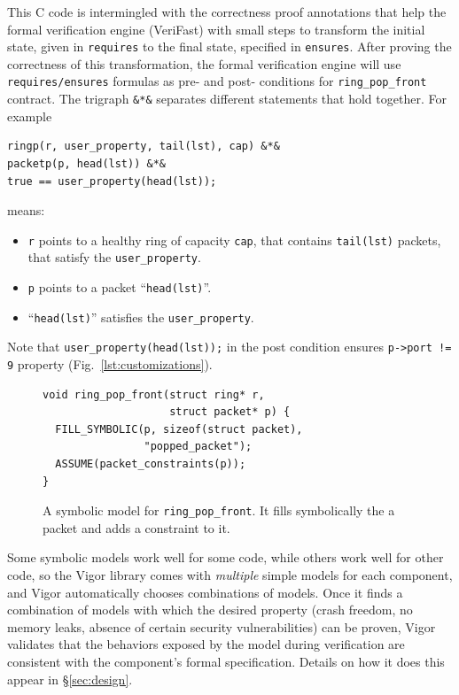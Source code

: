 \documentclass[letterpaper,twocolumn,10pt]{article}
\newcommand{\code}[1]{\lstinline{#1}}
\begin{document}
This C code is intermingled with the correctness proof annotations that help the
formal verification engine (VeriFast) with small steps to transform the initial
state, given in \code{requires} to the final state, specified in \code{ensures}.
After proving the correctness of this transformation, the formal verification
engine will use \code{requires/ensures} formulas as pre- and post- conditions
for \code{ring_pop_front} contract. The trigraph \code{&*&} separates different
statements that hold together. For example

\begin{lstlisting}
ringp(r, user_property, tail(lst), cap) &*&
packetp(p, head(lst)) &*&
true == user_property(head(lst));
\end{lstlisting}
means:
\begin{itemize}
\item \code{r} points to a healthy ring of capacity \code{cap}, that contains
  \code{tail(lst)} packets, that satisfy the \code{user_property}.
\item \code{p} points to a packet ``\code{head(lst)}''.
\item ``\code{head(lst)}'' satisfies the \code{user_property}.
\end{itemize}

Note that \code{user_property(head(lst));} in the post condition ensures
\code{p->port != 9} property (Fig.~\ref{lst:customizations}).

\begin{figure}[h!]
\begin{lstlisting}
void ring_pop_front(struct ring* r,
                    struct packet* p) {
  FILL_SYMBOLIC(p, sizeof(struct packet),
                "popped_packet");
  ASSUME(packet_constraints(p));
}
\end{lstlisting}
  \caption{A symbolic model for \code{ring_pop_front}. It fills symbolically the
    a packet and adds a constraint to it.}
  \label{lst:symbolic-model}
\end{figure}

Some symbolic models work well for some code, while others work well for other
code, so the Vigor library comes with {\em multiple} simple models for each
component, and Vigor automatically chooses combinations of models. Once it finds
a combination of models with which the desired property (crash freedom, no
memory leaks, absence of certain security vulnerabilities) can be proven, Vigor
validates that the behaviors exposed by the model during verification are
consistent with the component's formal specification. Details on how it does
this appear in \S\ref{sec:design}.
\end{document}
